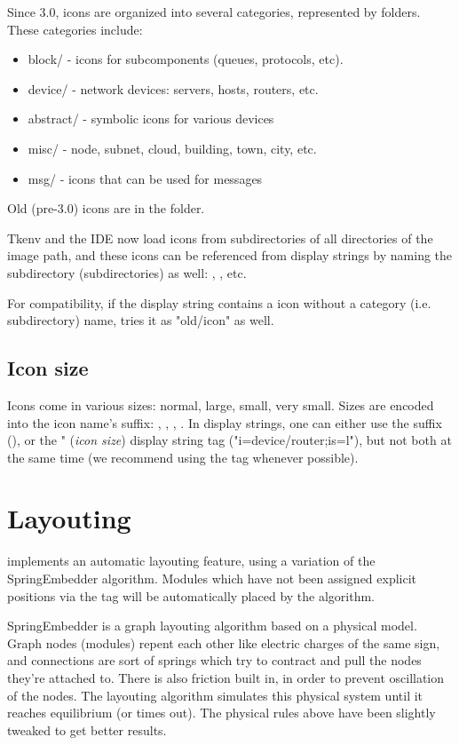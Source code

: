 Since {\opp} 3.0, icons are organized into several categories, represented
by folders. These categories include:

\begin{itemize}
  \item block/ - icons for subcomponents (queues, protocols, etc).
  \item device/ - network devices: servers, hosts, routers, etc.
  \item abstract/ - symbolic icons for various devices
  \item misc/ - node, subnet, cloud, building, town, city, etc.
  \item msg/ - icons that can be used for messages
\end{itemize}

Old (pre-3.0) icons are in the  folder.

Tkenv and the IDE now load icons from subdirectories of all directories
of the image path, and these icons can be referenced from display strings
by naming the subdirectory (subdirectories) as well:
, , etc.

For compatibility, if the display string contains a icon without
a category (i.e. subdirectory) name, {\opp} tries it as "old/icon" as well.

\subsection{Icon size}

Icons come in various sizes: normal, large, small, very small. Sizes are
encoded into the icon name's suffix: , , , .
In display strings, one can either use the suffix (),
or the " (\textit{icon size}) display string tag ("i=device/router;is=l"),
but not both at the same time (we recommend using the  tag whenever possible).


\section{Layouting}
\label{sec:ch-graphics:layouting}

{\opp} implements an automatic layouting feature, using
a variation of the SpringEmbedder algorithm. Modules which have
not been assigned explicit positions via the  tag will be
automatically placed by the algorithm.

SpringEmbedder is a graph layouting algorithm based on a physical model.
Graph nodes (modules) repent each other like electric charges
of the same sign, and connections are sort of springs which try
to contract and pull the nodes they're attached to. There is also friction
built in, in order to prevent oscillation of the nodes. The layouting algorithm
simulates this physical system until it reaches equilibrium
(or times out). The physical rules above have been slightly tweaked
to get better results.

